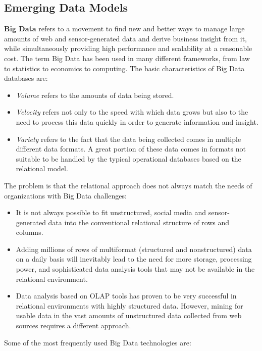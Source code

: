 \documentclass[a4paper, 12pt, titlepage]{report}
\begin{document}
\subsection{Emerging Data Models}
\textbf{Big Data} refers to a movement to find new and better ways to manage large amounts of web and sensor-generated data and derive business insight from it, while simultaneously providing high performance and scalability at a reasonable cost.
The term Big Data has been used in many different frameworks, from law to statistics to economics to computing. The basic characteristics of Big Data databases are:
\begin{itemize}
\item \emph{Volume} refers to the amounts of data being stored.
\item \emph{Velocity} refers not only to the speed with which data grows but also to the need to process this data quickly in order to generate information and insight.
\item \emph{Variety} refers to the fact that the data being collected comes in multiple different data formats. A great portion of these data comes in formats not suitable to be handled by the typical operational databases based on the relational model.
\end{itemize}
The problem is that the relational approach does not always match the needs of organizations with Big Data challenges:
\begin{itemize}
\item It is not always possible to fit unstructured, social media and sensor-generated data into the conventional relational structure of rows and columns.
\item Adding millions of rows of multiformat (structured and nonstructured) data on a daily basis will inevitably lead to the need for more storage, processing power, and sophisticated data analysis tools that may not be available in the relational environment.
\item Data analysis based on OLAP tools has proven to be very successful in relational environments with highly structured data. However, mining for usable data in the vast amounts of unstructured data collected from web sources requires a different approach.
\end{itemize}
Some of the most frequently used Big Data technologies are:
\end{document}
